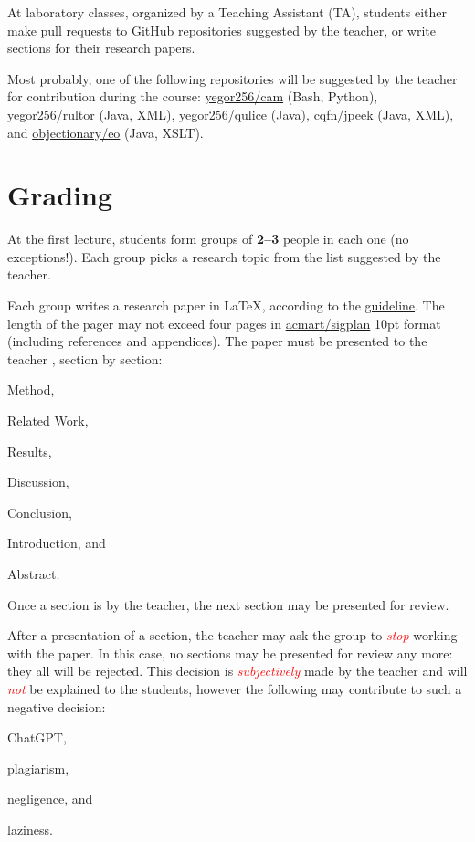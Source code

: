 \documentclass[nobrand,anonymous,nodate,nosecurity]{huawei}
\begin{document}
{At laboratory classes, organized by a Teaching Assistant (TA),
students either make pull requests to
GitHub repositories suggested by the teacher, or write sections
for their research papers.

Most probably, one of the following repositories will be suggested
by the teacher for contribution during the course:
\href{https://github.com/yegor256/cam}{yegor256/cam} (Bash, Python),
\href{https://github.com/yegor256/rultor}{yegor256/rultor} (Java, XML),
\href{https://github.com/yegor256/qulice}{yegor256/qulice} (Java),
\href{https://github.com/cqfn/jpeek}{cqfn/jpeek} (Java, XML),
and
\href{https://github.com/objectionary/eo}{objectionary/eo} (Java, XSLT).

\newpage
\section*{Grading}

At the first lecture, students form groups of \textbf{2--3} people in each one (no exceptions!).
Each group picks a research topic from the list suggested by the teacher.

Each group writes a research paper in \LaTeX, according
to the \href{https://www.yegor256.com/2022/08/24/research-paper-template.html}{guideline}.
The length of the pager may not exceed four pages in
\href{https://ctan.org/pkg/acmart}{acmart/sigplan} 10pt format
(including references and appendices).
The paper must be presented to the teacher , section by section:
\begin{inparaenum}[1)]
\item Method,
\item Related Work,
\item Results,
\item Discussion,
\item Conclusion,
\item Introduction,
and
\item Abstract.
\end{inparaenum}
Once a section is  by the teacher, the next section may be presented for review.

\newcommand\angry[1]{\textcolor{red}{\emph{#1}}}
After a presentation of a section, the teacher may ask the group to \angry{stop}
working with the paper. In this case, no sections may be presented for review any more: they all will be rejected.
This decision is \angry{subjectively} made by the teacher and will \angry{not} be explained
to the students, however the following may contribute to such a
negative decision:
\begin{inparaenum}[a)]
    \item ChatGPT,
    \item plagiarism,
    \item negligence,
    and
    \item laziness.
\end{inparaenum}

}
\end{document}
